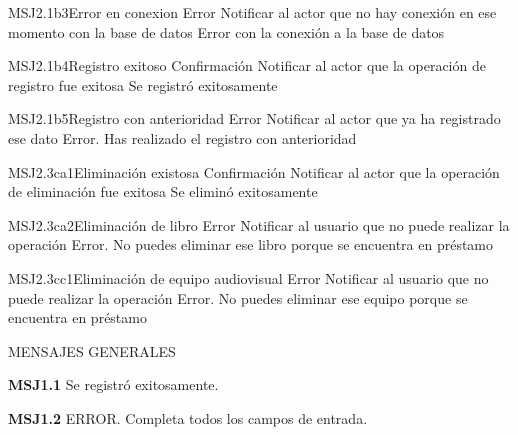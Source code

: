 	\begin{Message}{MSJ2.1b3}{Error en conexion}
		\MSGitem[Tipo:] Error	
		\MSGitem[Objetivo: ] Notificar al actor que no hay conexión en ese momento con la base de datos
		\MSGitem[Redacción: ] Error con la conexión a la base de datos
	\end{Message}
	
	\begin{Message}{MSJ2.1b4}{Registro exitoso}
		\MSGitem[Tipo:] Confirmación	
		\MSGitem[Objetivo: ] Notificar al actor que la operación de registro fue exitosa
		\MSGitem[Redacción: ] Se registró exitosamente
	\end{Message}
	
	\begin{Message}{MSJ2.1b5}{Registro con anterioridad}
		\MSGitem[Tipo:] Error	
		\MSGitem[Objetivo: ] Notificar al actor que ya ha registrado ese dato
		\MSGitem[Redacción: ] Error. Has realizado el registro con anterioridad
	\end{Message}
	
	\begin{Message}{MSJ2.3ca1}{Eliminación existosa}
		\MSGitem[Tipo:] Confirmación	
		\MSGitem[Objetivo: ] Notificar al actor que la operación de eliminación fue exitosa
		\MSGitem[Redacción: ] Se eliminó exitosamente
	\end{Message}
	
	\begin{Message}{MSJ2.3ca2}{Eliminación de libro}
		\MSGitem[Tipo:] Error	
		\MSGitem[Objetivo: ] Notificar al usuario que no puede realizar la operación
		\MSGitem[Redacción: ] Error. No puedes eliminar ese libro porque se encuentra en préstamo
	\end{Message}
	
	\begin{Message}{MSJ2.3cc1}{Eliminación de equipo audiovisual}
		\MSGitem[Tipo:] Error	
		\MSGitem[Objetivo: ] Notificar al usuario que no puede realizar la operación
		\MSGitem[Redacción: ] Error. No puedes eliminar ese equipo porque se encuentra en préstamo
	\end{Message}
	

MENSAJES GENERALES
	\begin{Citemize}
	\item {\bf MSJ1.1} Se registró exitosamente.
	\end{Citemize}
	
	\begin{Citemize}
	\item {\bf MSJ1.2} ERROR. Completa todos los campos de entrada.
	\end{Citemize}
	
